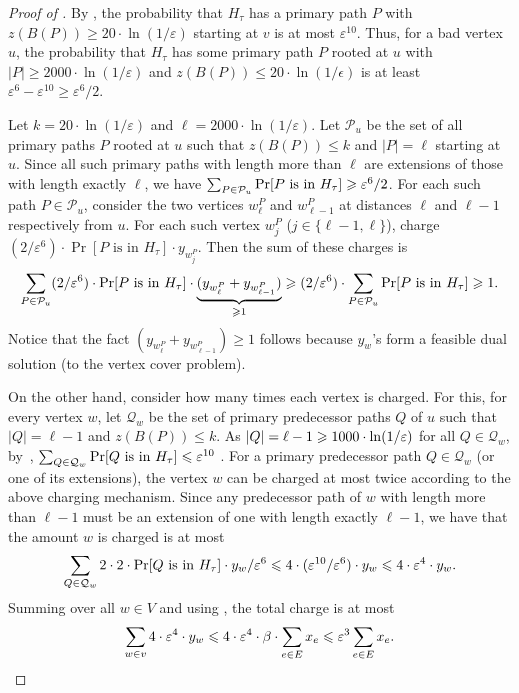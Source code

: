 \begin{proof}[Proof of ]
By , the probability that $H_\tau$ has a primary path $P$ with $z(B(P)) \geq 20 \cdot \ln (1/\varepsilon)$ 
starting at $v$ is at most $\varepsilon^{10}$.
Thus, for a bad vertex $u$, the probability that $H_\tau$ has some primary  path $P$ rooted at $u$ with  $|P| \geq 2000 \cdot \ln (1 / \varepsilon)$ and $z(B(P)) \leq 20 \cdot \ln(1/\epsilon)$ is at least $\varepsilon^6 - \varepsilon^{10} \geq \varepsilon^6/2$.

Let $k = 20 \cdot \ln(1/\varepsilon)$ and $\ell = 2000 \cdot \ln(1/\varepsilon)$.
Let $\mathcal{P}_u$ be the set of all primary paths $P$ rooted at $u$ such that $z(B(P)) \leq k$ and $|P| = \ell$ starting at $u$.
Since all such primary paths with length more than $\ell$ are extensions of those with length exactly $\ell$, we have
$\sum_{P \in \mathcal{P}_u} \Pr[P \text{ is in } H_\tau]  \geqslant \varepsilon^6/2$. 
For each such path $P \in \mathcal{P}_u$, consider the two vertices $w^P_\ell$ and $w^P_{\ell - 1}$ at distances $\ell$ and $\ell - 1$ respectively from $u$. 
For each such vertex $w^P_j$ ($j \in \{\ell-1,\ell\}$), charge $(2/\varepsilon^6) \cdot \Pr[P \text{ is in } H_\tau] \cdot y_{w^P_j}$.
Then the sum of these charges is 
$$\sum_{P \in \mathcal{P}_u}  (2/\varepsilon^6) \cdot \Pr[P \text{ is in } H_\tau] \cdot \underbrace{(y_{w^P_\ell} + y_{w^P_{\ell-1}})}_{\geqslant 1} \geqslant (2/\varepsilon^6) \cdot \sum_{P \in \mathcal{P}_u} \Pr[P \text{ is in } H_\tau]  \geqslant 1.$$
Notice that the fact $(y_{w^P_\ell} + y_{w^P_{\ell-1}}) \geq 1$ follows because $y_w$'s form a feasible dual solution (to the vertex cover problem).

On the other hand, consider how many times each vertex is charged. 
For this, for every vertex $w$, let $\mathcal{Q}_w$ be the set of primary predecessor paths $Q$ of $u$ such that $|Q| = \ell - 1$ and $z(B(P)) \leq k$. 
As $|Q| = \ell - 1 \geqslant 1000 \cdot \ln(1/\varepsilon)$ for all $Q \in \mathcal{Q}_w$, by~, $\sum_{Q \in \mathcal{Q}_w} \Pr[Q \text{ is in } H_\tau] \leqslant \varepsilon^{10}$ . 
For a primary predecessor path $Q \in \mathcal{Q}_w$ (or one of its extensions), the vertex $w$ can be charged at most twice according to the above charging mechanism. Since any predecessor path of $w$ with length more than $\ell - 1$ must be an extension of one with length exactly $\ell - 1$, we have that the amount $w$ is charged is at most
$$\sum_{Q \in \mathcal{Q}_w} 2 \cdot 2 \cdot \Pr[Q \text{ is in } H_\tau] \cdot y_w/ \varepsilon^6 \leqslant 4 \cdot (\varepsilon^{10}/\varepsilon^6) \cdot y_w \leqslant 4 \cdot \varepsilon^4 \cdot y_w.$$
Summing over all $w \in V$ and using , the total charge is at most
\begin{equation*}\sum_{w \in v} 4 \cdot \varepsilon^4 \cdot y_w \leqslant 4 \cdot \varepsilon^4 \cdot \beta \cdot \sum_{e \in E} x_{e} \leqslant \varepsilon^3 \sum_{e \in E} x_{e}. \qedhere
\end{equation*}
\end{proof}

